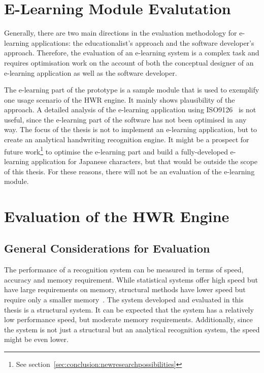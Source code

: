 \section{E-Learning Module Evalutation}
\label{sec:eval:elearning}
Generally, there are two main directions in the evaluation methodology
for e-learning applications: the educationalist's approach and the 
software developer's approach.
Therefore, the evaluation of an e-learning system is a complex task
and requires optimisation work on the account of both the conceptual
designer of an e-learning application as well as the software developer.

The e-learning part of the prototype is a sample module that is used 
to exemplify one usage scenario of the HWR engine. 
It mainly shows plausibility of the approach. A detailed analysis of the
e-learning application using ISO9126~ is not useful,
since the e-learning part of the software has not been optimised in any way.
The focus of the thesis is not to implement an e-learning application,
but to create an analytical handwriting recognition engine.
It might be a prospect for future 
work\footnote{See section~\ref{sec:conclusion:newresearchpossibilities}}
to optimise the e-learning part and build a fully-developed e-learning
application for Japanese characters, but that would be outside the scope of 
this thesis. For these reasons, there will not be an evaluation of the
e-learning module.

\section{Evaluation of the HWR Engine}
\label{sec:eval:hwreval}

\subsection{General Considerations for Evaluation}
\label{sec:eval:generalconsiderations}

The performance of a recognition system can be measured in terms of speed,
accuracy and memory requirement.
While statistical systems offer high speed but have large requirements on memory,
structural methods have lower speed but require only a smaller 
memory~.
The system developed and evaluated in this thesis is a structural system.
It can be expected that the system has a relatively low performance speed,
but moderate memory requirements. 
Additionally, since the system is not just a structural but an analytical
recognition system, the speed might be even lower.

